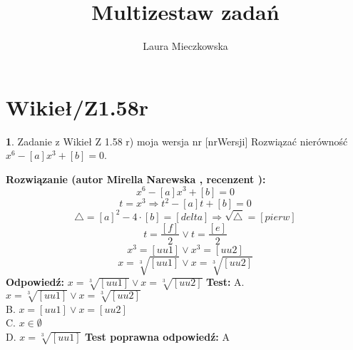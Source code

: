 \documentclass[12pt, a4paper]{article}
\title{Multizestaw zadań}
\author{Laura Mieczkowska}
\date{}
\theoremstyle{definition} %
\newtheorem{zad}{}
\newcommand{\kategoria}[1]{\section{#1}} %
\newcommand{\zadStart}[1]{\begin{zad}#1\newline} %
\newcommand{\zadStop}{\end{zad}}   %
\newcommand{\rozwStart}[2]{\noindent \textbf{Rozwiązanie (autor #1 , recenzent #2): }\newline} %
\newcommand{\odpStart}{\noindent \textbf{Odpowiedź:}\newline}    %
\newcommand{\odpStop}{\newline}                                             %
\newcommand{\testStart}{\noindent \textbf{Test:}\newline} %
\newcommand{\testStop}{\newline} %
\newcommand{\kluczStart}{\noindent \textbf{Test poprawna odpowiedź:}\newline} %
\newcommand{\kluczStop}{\newline} %
\begin{document}
\maketitle


\kategoria{Wikieł/Z1.58r}
\zadStart{Zadanie z Wikieł Z 1.58 r) moja wersja nr [nrWersji]}
Rozwiązać nierówność $x^6-[a]x^3+[b]=0$.
\zadStop
\rozwStart{Mirella Narewska}{}
$$x^6-[a]x^3+[b]=0$$
$$t=x^3 \Rightarrow t^2-[a]t+[b]=0$$ 
$$\triangle=[a]^2-4\cdot [b]=[delta] \Rightarrow \sqrt{\triangle}=[pierw]$$
$$t=\frac{[f]}{2} \vee t=\frac{[e]}{2}$$
$$x^3=[uu1] \vee x^3=[uu2]$$
$$x=\sqrt[3]{[uu1]} \vee x=\sqrt[3]{[uu2]}$$
\odpStart
$x=\sqrt[3]{[uu1]} \vee x=\sqrt[3]{[uu2]}$
\odpStop
\testStart
A. $x=\sqrt[3]{[uu1]} \vee x=\sqrt[3]{[uu2]}$ \\
B. $x=[uu1] \vee x=[uu2]$ \\
C. $x\in\emptyset$ \\
D. $x=\sqrt[3]{[uu1]}$ 
\testStop
\kluczStart
A
\kluczStop
\end{document}
